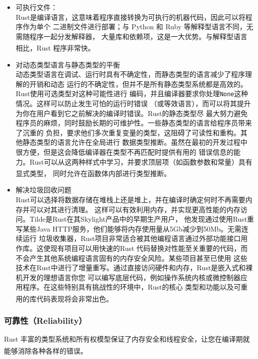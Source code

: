 \documentclass[UTF8,fontset=none,linespread=1.15]{ctexart}
\let\nosupcite\cite
\renewcommand*{\cite}[1]{\textsuperscript{\nosupcite{#1}}}
\begin{document}
\begin{itemize}
\item 可执行文件：\\
  Rust是编译语言，这意味着程序直接转换为可执行的机器代码，因此可以将程序作为单个
  二进制文件进行部署；与 Python 和 Ruby 等解释型语言不同，无需随程序一起分发解释器，
  大量库和依赖项，这是一大优势。与解释型语言相比，Rust 程序非常快。\cite{bib:4-rust-go-cmp}

\item 对动态类型语言与静态类型的平衡\\
  动态类型语言在调试、运行时具有不确定性，而静态类型的语言减少了程序理解的开销和动态
  运行的不确定性，但并不是所有静态类型系统都是高效的。Rust使用可选类型对这种可能性进行
  编码，并且编译器要求你处理\texttt{None}这种情况。这样可以防止发生可怕的运行时错误
  （或等效语言），而可以将其提升为你在用户看到它之前解决的编译时错误。Rust的静态类型尽
  最大努力避免程序员的麻烦，同时鼓励长期的可维护性。一些静态类型的语言给程序员带来了沉重的
  负担，要求他们多次重复变量的类型，这阻碍了可读性和重构。其他静态类型的语言允许在全局进行
  数据类型推断。虽然在最初的开发过程中很方便，但是这会降低编译器在类型不再匹配时提供有用的
  错误信息的能力。Rust可以从这两种样式中学习，并要求顶层项（如函数参数和常量）具有显式类型，
  同时允许在函数体内部进行类型推断。\cite{bib:3-why-rust-pop}

\item 解决垃圾回收问题\\
  Rust可以选择将数据存储在堆栈上还是堆上，并在编译时确定何时不再需要内存并可以对其进行清理。
  这样可以有效利用内存，并实现更高性能的内存访问。Tilde是Rust在其Skylight产品中的早期生产用户，
  他发现通过使用Rust重写某些Java HTTP服务，他们能够将内存使用量从5Gb减少到50Mb。无需连续运行
  垃圾收集器，Rust项目非常适合被其他编程语言通过外部功能接口用作库。这使现有项目可以用快速的Rust
  代码替换对性能至关重要的代码，而不会产生其他系统编程语言固有的内存安全风险。某些项目甚至已使用
  这些技术在Rust中进行了增量重写。通过直接访问硬件和内存，Rust是嵌入式和裸机开发的理想语言你您
  可以编写底层代码，例如操作系统内核或微控制器应用程序。在这些特别具有挑战性的环境中，Rust的核心
  类型和功能以及可重用的库代码表现将会非常出色。\cite{bib:3-why-rust-pop}
\end{itemize}

\subsubsection{可靠性（Reliability）}

Rust 丰富的类型系统和所有权模型保证了内存安全和线程安全，让您在编译期就能够消除各种各样的错误。\cite{bib:1-rust-lang}
\end{document}
